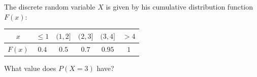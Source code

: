 \noindent The discrete random variable $X$ is given by his cumulative distribution function $F(x)$:\bigskip

\begin{center}
    \begin{tabular}{*{6}{c}}
        \toprule
            $x$ & $\leq 1$ & $(1, 2]$ & $(2,3]$ & $(3,4]$ & $>4$ \\
        \midrule
            $F(x)$ & $0.4$ & $0.5$ & $0.7$ & $0.95$ & $1$ \\
        \bottomrule
    \end{tabular}
\end{center}\bigskip

\noindent What value does $P(X = 3)$ have?